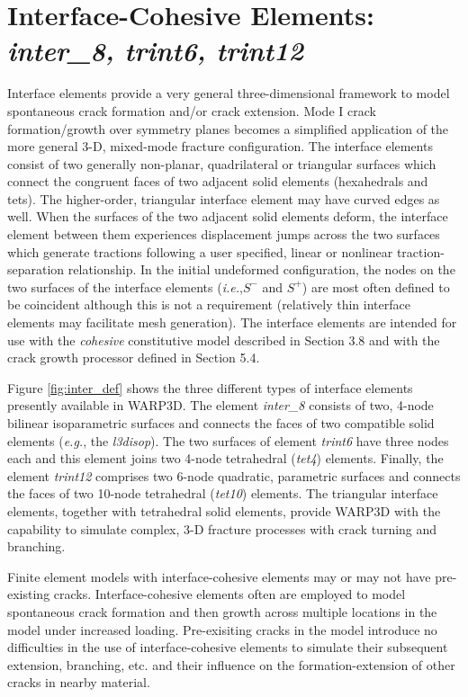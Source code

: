 \documentclass[11pt]{report}
\numberwithin{equation}{section}
\newcommand{\eg}{\emph{e.g.},\xspace}
\newcommand{\ie}{\emph{i.e.},\xspace}
\newcommand{\ti}{\emph}
\begin{document}
\section{Interface-Cohesive Elements:\ti{ inter\_8, trint6, trint12}}

Interface elements provide a very general three-dimensional framework to 
model spontaneous crack formation and/or crack extension. Mode I crack formation/growth
over symmetry planes becomes a simplified application of the more
general 3-D, mixed-mode fracture configuration. The interface elements consist of two 
generally non-planar, quadrilateral or triangular surfaces 
which connect the congruent faces of two adjacent 
solid elements (hexahedrals and tets). The higher-order, triangular interface element
may have curved edges as well.  When the surfaces of the two adjacent solid 
elements deform, the interface element between them experiences 
displacement jumps across the two surfaces which 
generate tractions following a user specified, linear or nonlinear
traction-separation relationship. In the initial undeformed configuration, 
the nodes on the two surfaces of the interface elements (\ie $S^-$ and $S^+$) 
are most often defined to be coincident although this is not a requirement
(relatively thin interface elements may facilitate mesh
generation). The interface elements are intended for use with 
the \ti{cohesive} constitutive model described in Section 3.8 and with the crack growth
processor defined in Section 5.4. 

Figure \ref{fig:inter_def} shows the three different types of interface 
elements presently available in WARP3D. The element \ti{inter\_8 }consists 
of two, 4-node bilinear isoparametric surfaces and connects the faces of 
two compatible solid elements (\eg the \ti{l3disop}). The two surfaces 
of element \ti{trint6} have three nodes each and this element joins 
two 4-node tetrahedral 
(\ti{tet4}) elements. Finally, the element \ti{trint12} comprises 
two 6-node quadratic, parametric surfaces and connects the faces 
of two 10-node tetrahedral (\ti{tet10}) elements. The triangular interface 
elements, together with tetrahedral solid elements, provide WARP3D 
with the capability to simulate complex, 3-D fracture processes with
crack turning and branching.

Finite element models with interface-cohesive elements may or 
may not have pre-existing cracks. Interface-cohesive elements often
are employed to model spontaneous crack formation and then growth 
across multiple locations in the model under increased loading. Pre-exisiting
cracks in the model introduce no difficulties in the use of interface-cohesive
elements to simulate their subsequent extension, branching, etc. and their
influence on the formation-extension of other cracks in nearby
material.
\end{document}
